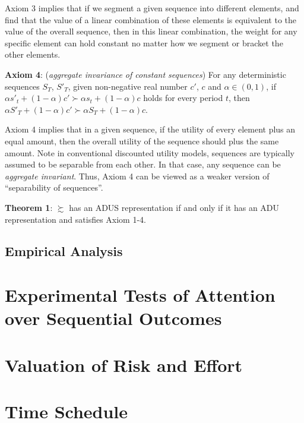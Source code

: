 \documentclass[
  12pt,
]{article}
\begin{document}
Axiom 3 implies that if we segment a given sequence into different
elements, and find that the value of a linear combination of these
elements is equivalent to the value of the overall sequence, then in
this linear combination, the weight for any specific element can hold
constant no matter how we segment or bracket the other elements.

\textbf{Axiom 4}: (\emph{aggregate invariance of constant sequences})
For any deterministic sequences \(S_T\), \(S'_T\), given non-negative
real number \(c'\), \(c\) and \(\alpha\in(0,1)\), if
\(\alpha s'_t+(1-\alpha)c'\succ\alpha s_t+(1-\alpha)c\) holds for every
period \(t\), then
\(\alpha S'_T+(1-\alpha)c'\succ \alpha S_T+(1-\alpha)c\).

Axiom 4 implies that in a given sequence, if the utility of every
element plus an equal amount, then the overall utility of the sequence
should plus the same amount. Note in conventional discounted utility
models, sequences are typically assumed to be separable from each other.
In that case, any sequence can be \emph{aggregate invariant}. Thus,
Axiom 4 can be viewed as a weaker version of ``separability of
sequences''.

\textbf{Theorem 1}: \(\succsim\) has an ADUS representation if and only
if it has an ADU representation and satisfies Axiom 1-4.

\hypertarget{empirical-analysis}{%
\subsection{Empirical Analysis}\label{empirical-analysis}}

\hypertarget{experimental-tests-of-attention-over-sequential-outcomes}{%
\section{Experimental Tests of Attention over Sequential
Outcomes}\label{experimental-tests-of-attention-over-sequential-outcomes}}

\hypertarget{valuation-of-risk-and-effort}{%
\section{Valuation of Risk and
Effort}\label{valuation-of-risk-and-effort}}

\hypertarget{time-schedule}{%
\section{Time Schedule}\label{time-schedule}}

\renewcommand\refname{Reference}
  
\end{document}
